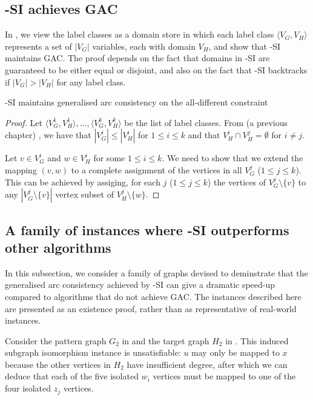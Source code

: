 \subsection{\McSplit-SI achieves GAC}

In , we view the label classes as a domain store in which each label
class $\langle V_G, V_H \rangle$ represents a set of $|V_G|$ variables, each with domain $V_H$,
and show that \McSplit-SI maintains GAC.  The proof depends on the fact that domains in
\McSplit-SI are guaranteed to be
either equal or disjoint, and also on the fact that \McSplit-SI backtracks if $|V_G| > |V_H|$
for any label class.

\begin{proposition}\label{gacProposition}
    \McSplit-SI maintains generalised arc consistency on the all-different constraint
\end{proposition}

\begin{proof}
Let $\langle V_G^1, V_H^1 \rangle, \dots, \langle V_G^k, V_H^k \rangle$ be the list of
label classes.  From (a previous chapter) , we have that $|V_G^i| \leq |V_H^i|$
for $1 \leq i \leq k$ and that $V_H^i \cap V_H^j = \emptyset$ for $i \not= j$.

Let $v \in V_G^i$ and $w \in V_H^i$ for some $1 \leq i \leq k$.  We need to show that we
extend the mapping
$(v,w)$ to a complete assignment of the vertices in all $V_G^j$ ($1 \leq j \leq k$).
This can be achieved by assiging, for each $j$ ($1 \leq j \leq k$) the vertices of
$V_G^j \setminus \{v\}$ to any $|V_G^j \setminus \{v\}|$ vertex subset of
$V_H^j \setminus \{w\}$.
\end{proof}

\subsection{A family of instances where \McSplit-SI outperforms other algorithms}

In this subsection, we consider a family of graphs devised to deminstrate
that the generalised arc consistency achieved by \McSplit-SI can give a dramatic
speed-up compared to algorithms that do not achieve GAC.
The instances described here are presented as an existence proof, rather than
as representative of real-world instances.

Consider the pattern graph $G_2$ in  and the target
graph $H_2$ in .  This induced subgraph isomorphism
instance is unsatisfiable: $u$ may only be mapped to $x$ because the other
vertices in $H_2$ have insufficient degree, after which we can deduce
that each of the five isolated $w_i$ vertices must be mapped to one of the four
isolated $z_j$ vertices.

